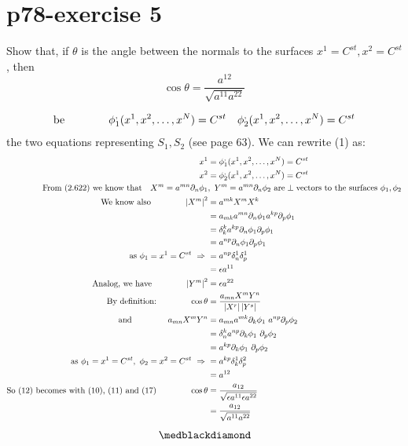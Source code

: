 \section{p78-exercise 5}
\begin{tcolorbox}
Show that, if $\theta$ is the angle between the normals to the surfaces $x^1 = C^{st}, x^2 = C^{st}$, then $$ \cos \theta = \frac{a^{12}}{\sqrt{a^{11}a^{22}}}$$
\end{tcolorbox}
\begin{align}
\text{be}\quad\quad\quad\quad \phi^{,}_1(x^1,x^2,\dots,x^N) = C^{st} \quad \phi^{,}_2(x^1,x^2,\dots,x^N) = C^{st}
\end{align}
the two equations representing $S_1, S_2$ (see page 63). We can rewrite (1) as:
\begin{align}
\ x^1 &= \phi^{,}_1(x^1,x^2,\dots,x^N) = C^{st} \\
\ x^2 &= \phi^{,}_2(x^1,x^2,\dots,x^N) = C^{st}\\
\text{From (2.622) we know that}\quad X^m = a^{mn}\partial_n \phi_{1} & ,\ Y^m = a^{mn}\partial_n \phi_{2} \ \text{are}\perp\text{vectors to the surfaces}\  \phi_{1},\phi_{2}\\
\text{We know also} \spatie \left|X^m\right |^2 &= a^{mk}X^mX^k\\
\ & = a_{mk}a^{mn}\partial_n \phi_{1}a^{kp}\partial_p \phi_{1}\\
\ & = \delta^k_k a^{kp}\partial_n \phi_{1}\partial_p \phi_{1}\\
\ & = a^{np}\partial_n \phi_{1}\partial_p \phi_{1}\\
\text{as} \ \phi_1 = x^1 = C^{st} \ \Rightarrow \ &= a^{np}\delta^1_n \delta^1_p\\
\ &= \epsilon a^{11}\\
\text{Analog, we have}\spatie \left|Y^m\right |^2 &= \epsilon a^{22}\\
\text{By definition:}\spatie \cos\theta &= \frac{a_{mn}X^mY^n}{ \left|X^r\right | \left|Y^s\right |}\\
\text{and }\spatie a_{mn}X^mY^n &= a_{mn} a^{mk}\partial_k \phi_{1} \  a^{np}\partial_p \phi_{2}\\
\ &=\delta^k_n a^{np}\partial_k \phi_{1} \ \partial_p \phi_{2}\\
\ &=a^{kp}\partial_k \phi_{1} \ \partial_p \phi_{2}\\
\text{as} \ \phi_1 = x^1 = C^{st},  \ \phi_2 = x^2 = C^{st} \ \Rightarrow \ &= a^{kp}\delta^1_k\delta^2_p\\
\ &= a^{12}\\
\text{So (12) becomes with (10), (11) and (17)} \spatie \cos\theta &= \frac{a_{12}}{ \sqrt{\epsilon a^{11}\epsilon a^{22}}}\\
&= \frac{a_{12}}{ \sqrt{ a^{11} a^{22}}}
\end{align}
$$\medblackdiamond$$
\newpage

